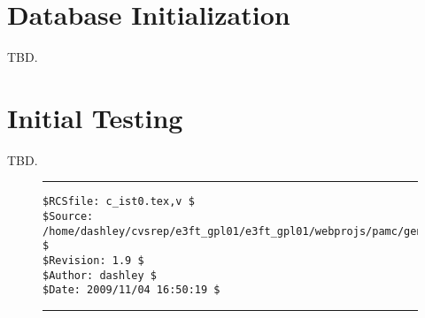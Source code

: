 \section{Database Initialization}
\label{cist0:sdiz0}

TBD.


\section{Initial Testing}
\label{cist0:sits0}

TBD.


\noindent\begin{figure}[!b]
\noindent\rule[-0.25in]{\textwidth}{1pt}
\begin{tiny}
\begin{verbatim}
$RCSfile: c_ist0.tex,v $
$Source: /home/dashley/cvsrep/e3ft_gpl01/e3ft_gpl01/webprojs/pamc/gen_a/docs/manual/man_a/c_ist0/c_ist0.tex,v $
$Revision: 1.9 $
$Author: dashley $
$Date: 2009/11/04 16:50:19 $
\end{verbatim}
\end{tiny}
\noindent\rule[0.25in]{\textwidth}{1pt}
\end{figure}

%
%
%
%
%
%
%
%
%
